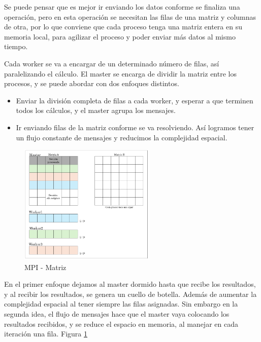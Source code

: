 	Se puede pensar que es mejor ir enviando los datos conforme se finaliza una operación, pero en esta operación se necesitan las filas de una matriz y columnas de otra, por lo que conviene que cada proceso tenga una matriz entera en su memoria local, para agilizar el proceso y poder enviar más datos al mismo tiempo.


	Cada worker se va a encargar de un determinado número de filas, así paralelizando el cálculo. El master se encarga de dividir la matriz entre los procesos, y se puede abordar con dos enfoques distintos.
	\begin{itemize}
		\item Enviar la división completa de filas a cada worker, y esperar a que terminen todos los cálculos, y el master agrupa los mensajes. 
		\item Ir enviando filas de la matriz conforme se va resolviendo. Así logramos tener un flujo constante de mensajes y reducimos la complejidad espacial.
	\end{itemize}



	\begin{figure}[!h]
		\centering
		\includegraphics[width=0.58\textwidth]{images/chapter_3/matriz_mpi}
		\caption{MPI - Matriz}
		\label{fig:matrizmpi}
	\end{figure}
	
	En el primer enfoque dejamos al master dormido hasta que recibe los resultados, y al recibir los resultados, se genera un cuello de botella. Además de aumentar la complejidad espacial al tener siempre las filas asignadas. Sin embargo en la segunda idea, el flujo de mensajes hace que el master vaya colocando los resultados recibidos, y se reduce el espacio en memoria, al manejar en cada iteración una fila. Figura \ref{fig:matrizmpi}


	
